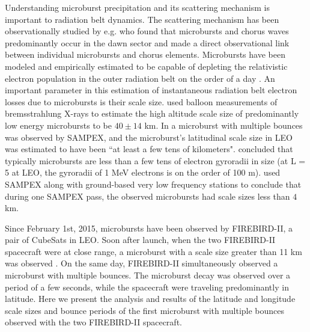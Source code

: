 Understanding microburst precipitation and its scattering mechanism is important to radiation belt dynamics. The scattering mechanism has been observationally studied by e.g. \citet{Lorentzen2001b} who found that microbursts and chorus waves predominantly occur in the dawn sector and \citet{Breneman2017} made a direct observational link between individual microbursts and chorus elements. Microbursts have been modeled and empirically estimated to be capable of depleting the relativistic electron population in the outer radiation belt on the order of a day \citep{O'Brien2004, Thorne2005, Shprits2007, Breneman2017}. An important parameter in this estimation of instantaneous radiation belt electron losses due to microbursts is their scale size. \citet{Parks1967} used balloon measurements of bremsstrahlung X-rays to estimate the high altitude scale size of predominantly low energy microbursts to be $40 \pm 14$ km. In \citet{Blake1996} a microburst with multiple bounces was observed by SAMPEX, and the microburst's latitudinal scale size in LEO was estimated to have been ``at least a few tens of kilometers". \citet{Blake1996} concluded that typically microbursts are less than a few tens of electron gyroradii in size (at L = 5 at LEO, the gyroradii of 1 MeV electrons is on the order of 100 m). \citet{Dietrich2010} used SAMPEX along with ground-based very low frequency stations to conclude that during one SAMPEX pass, the observed microbursts had scale sizes less than $4$ km.

Since February 1st, 2015, microbursts have been observed by FIREBIRD-II, a pair of CubeSats in LEO. Soon after launch, when the two FIREBIRD-II spacecraft were at close range, a microburst with a scale size greater than 11 km was observed \citep{Crew2016}. On the same day, FIREBIRD-II simultaneously observed a microburst with multiple bounces. The microburst decay was observed over a period of a few seconds, while the spacecraft were traveling predominantly in latitude. Here we present the analysis and results of the latitude and longitude scale sizes and bounce periods of the first microburst with multiple bounces observed with the two FIREBIRD-II spacecraft.

